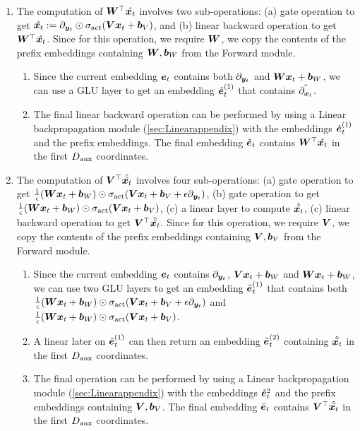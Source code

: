 \begin{enumerate}
    \item The computation of ${\bm{W}}^{\top} \Hat{{\bm{x}}_t}$ involves two sub-operations: (a)  gate operation to get $\Hat{{\bm{x}}_t} := \partial_{{\bm{y}}_t} \odot \sigma_{\textrm{act}}( {\bm{V}} {\bm{x}}_t + {\bm{b}}_V )$, and (b) linear backward operation to get ${\bm{W}}^{\top} \Hat{{\bm{x}}_t}$. Since for this operation, we require ${\bm{W}}$, we copy the contents of the prefix embeddings containing ${\bm{W}}, {\bm{b}}_W$ from the Forward module.
    
    \begin{enumerate}
        \item Since the current embedding $\ve_t$ contains both $\partial_{{\bm{y}}_t}$ and ${\bm{W}} {\bm{x}}_t + {\bm{b}}_W$, we can use a \simulator{} GLU layer to get an embedding $\Hat{\ve}^{(1)}_t$ that contains $\Hat{\partial_{{\bm{x}}_t}}$.
        \item The final linear backward operation can be performed by using a \simulator{} Linear backpropagation module (\cref{sec:Linearappendix}) with the embeddings $\Hat{\ve}^{(1)}_t$ and the prefix embeddings. The final embedding $\Hat{\ve}_t$ contains ${\bm{W}}^{\top} \Hat{{\bm{x}}_t}$ in the first $D_{\text{aux}}$ coordinates.
    \end{enumerate}
    
    \item The computation of ${\bm{V}}^{\top} \Hat{\Tilde{{\bm{x}}_t}}$ involves four sub-operations: (a)  gate operation to get $\frac{1}{\epsilon} ({\bm{W}} {\bm{x}}_t + {\bm{b}}_W) \odot \sigma_{\textrm{act}}( {\bm{V}} {\bm{x}}_t + {\bm{b}}_V + \epsilon \partial_{{\bm{y}}_t} )$, (b)  gate operation to get $\frac{1}{\epsilon}({\bm{W}} {\bm{x}}_t + {\bm{b}}_W) \odot \sigma_{\textrm{act}}( {\bm{V}} {\bm{x}}_t + {\bm{b}}_V )$, (c) a linear layer to compute $\Hat{\Tilde{{\bm{x}}_t}}$, 
    (c) linear backward operation to get ${\bm{V}}^{\top} \Hat{\Tilde{{\bm{x}}_t}}$. Since for this operation, we require ${\bm{V}}$, we copy the contents of the prefix embeddings containing ${\bm{V}}, {\bm{b}}_V$ from the Forward module.
    
    \begin{enumerate}
        \item Since the current embedding $\ve_t$ contains  $\partial_{{\bm{y}}_t}$, ${\bm{V}} {\bm{x}}_t + {\bm{b}}_W$ and ${\bm{W}} {\bm{x}}_t + {\bm{b}}_W$, we can use two \simulator{} GLU layers to get an embedding $\Tilde{\ve}^{(1)}_t$ that contains both $\frac{1}{\epsilon} ({\bm{W}} {\bm{x}}_t + {\bm{b}}_W) \odot \sigma_{\textrm{act}}( {\bm{V}} {\bm{x}}_t + {\bm{b}}_V + \epsilon \partial_{{\bm{y}}_t} )$ and $\frac{1}{\epsilon} ({\bm{W}} {\bm{x}}_t + {\bm{b}}_W) \odot \sigma_{\textrm{act}}( {\bm{V}} {\bm{x}}_t + {\bm{b}}_V)$.
        \item A linear later on  $\Tilde{\ve}^{(1)}_t$ can then return an embedding $\Tilde{\ve}^{(2)}_t$ containing $\Hat{\Tilde{{\bm{x}}_t}}$ in the first $D_{\text{aux}}$ coordinates.
        \item The final operation can be performed by using a \simulator{} Linear backpropagation module (\cref{sec:Linearappendix}) with the embeddings $\Hat{\ve}^2_t$ and the prefix embeddings containing ${\bm{V}}, {\bm{b}}_V$. The final embedding $\Tilde{\ve}_t$ contains ${\bm{V}}^{\top} \Hat{\Tilde{{\bm{x}}_t}}$ in the first $D_{\text{aux}}$ coordinates.
    \end{enumerate}

\end{enumerate}


